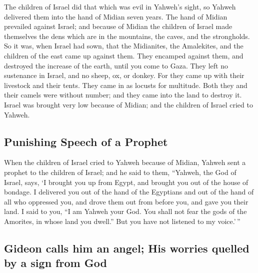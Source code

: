  The children of Israel did that which was evil in
Yahweh's sight, so Yahweh delivered them into the hand of Midian seven
years.  The hand of Midian prevailed against Israel; and
because of Midian the children of Israel made themselves the dens which
are in the mountains, the caves, and the strongholds.  So
it was, when Israel had sown, that the Midianites, the Amalekites, and
the children of the east came up against them.  They
encamped against them, and destroyed the increase of the earth, until
you come to Gaza. They left no sustenance in Israel, and no sheep, ox,
or donkey.  For they came up with their livestock and
their tents. They came in as locusts for multitude. Both they and their
camels were without number; and they came into the land to destroy it.
 Israel was brought very low because of Midian; and the
children of Israel cried to Yahweh.

\hypertarget{punishing-speech-of-a-prophet}{%
\subsection{Punishing Speech of a
Prophet}\label{punishing-speech-of-a-prophet}}

 When the children of Israel cried to Yahweh because of
Midian,  Yahweh sent a prophet to the children of Israel;
and he said to them, ``Yahweh, the God of Israel, says, `I brought you
up from Egypt, and brought you out of the house of bondage.
 I delivered you out of the hand of the Egyptians and out
of the hand of all who oppressed you, and drove them out from before
you, and gave you their land.  I said to you, ``I am
Yahweh your God. You shall not fear the gods of the Amorites, in whose
land you dwell.'' But you have not listened to my voice.'\,''

\hypertarget{gideon-calls-him-an-angel-his-worries-quelled-by-a-sign-from-god}{%
\subsection{Gideon calls him an angel; His worries quelled by a sign
from
God}\label{gideon-calls-him-an-angel-his-worries-quelled-by-a-sign-from-god}}

